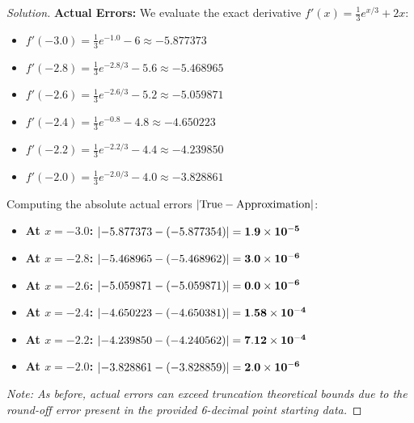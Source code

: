 \documentclass[11pt, a4paper]{article}
\DeclarePairedDelimiter\abs{\lvert}{\rvert}
\newif\ifsolutionnewpage
\newenvironment{solution}
  {\begin{proof}[Solution]}
  {\end{proof}\ifsolutionnewpage\newpage\fi}
\begin{document}
\begin{solution}
    \textbf{Actual Errors:}
    We evaluate the exact derivative $f'(x) = \frac{1}{3}e^{x/3} + 2x$:
    \begin{itemize}
        \item $f'(-3.0) = \frac{1}{3}e^{-1.0} - 6 \approx -5.877373$
        \item $f'(-2.8) = \frac{1}{3}e^{-2.8/3} - 5.6 \approx -5.468965$
        \item $f'(-2.6) = \frac{1}{3}e^{-2.6/3} - 5.2 \approx -5.059871$
        \item $f'(-2.4) = \frac{1}{3}e^{-0.8} - 4.8 \approx -4.650223$
        \item $f'(-2.2) = \frac{1}{3}e^{-2.2/3} - 4.4 \approx -4.239850$
        \item $f'(-2.0) = \frac{1}{3}e^{-2.0/3} - 4.0 \approx -3.828861$
    \end{itemize}
    
    Computing the absolute actual errors $\abs{\text{True} - \text{Approximation}}$:
    \begin{itemize}
        \item \textbf{At $x = -3.0$:} $\abs{-5.877373 - (-5.877354)} = \mathbf{1.9 \times 10^{-5}}$
        \item \textbf{At $x = -2.8$:} $\abs{-5.468965 - (-5.468962)} = \mathbf{3.0 \times 10^{-6}}$
        \item \textbf{At $x = -2.6$:} $\abs{-5.059871 - (-5.059871)} = \mathbf{0.0 \times 10^{-6}}$
        \item \textbf{At $x = -2.4$:} $\abs{-4.650223 - (-4.650381)} = \mathbf{1.58 \times 10^{-4}}$
        \item \textbf{At $x = -2.2$:} $\abs{-4.239850 - (-4.240562)} = \mathbf{7.12 \times 10^{-4}}$
        \item \textbf{At $x = -2.0$:} $\abs{-3.828861 - (-3.828859)} = \mathbf{2.0 \times 10^{-6}}$
    \end{itemize}
    \textit{Note: As before, actual errors can exceed truncation theoretical bounds due to the round-off error present in the provided 6-decimal point starting data.}
    \end{solution}
\end{document}
